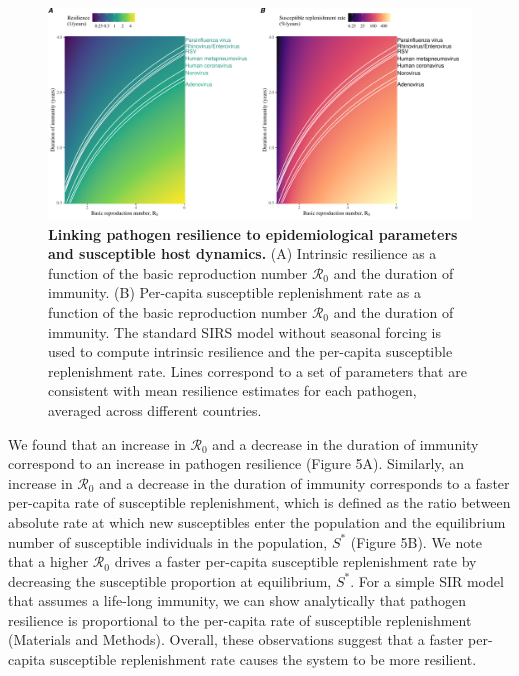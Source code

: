 \documentclass[12pt]{article}
\begin{document}
\begin{figure}[!th]
\begin{center}
\includegraphics[width=\textwidth]{../figure5/figure5.pdf}
\caption{
\textbf{Linking pathogen resilience to epidemiological parameters and susceptible host dynamics.}
(A) Intrinsic resilience as a function of the basic reproduction number $\mathcal R_0$ and the duration of immunity.
(B) Per-capita susceptible replenishment rate as a function of the basic reproduction number $\mathcal R_0$ and the duration of immunity.
The standard SIRS model without seasonal forcing is used to compute intrinsic resilience and the per-capita susceptible replenishment rate.
Lines correspond to a set of parameters that are consistent with mean resilience estimates for each pathogen, averaged across different countries.
}
\end{center}
\end{figure}

We found that an increase in $\mathcal R_0$ and a decrease in the duration of immunity correspond to an increase in pathogen resilience (Figure 5A).
Similarly, an increase in $\mathcal R_0$ and a decrease in the duration of immunity corresponds to a faster per-capita rate of susceptible replenishment, which is defined as the ratio between absolute rate at which new susceptibles enter the population and the equilibrium number of susceptible individuals in the population, $S^\ast$ (Figure 5B).
We note that a higher $\mathcal R_0$ drives a faster per-capita susceptible replenishment rate by decreasing the susceptible proportion at equilibrium, $S^\ast$.
For a simple SIR model that assumes a life-long immunity, we can show analytically that pathogen resilience is proportional to the per-capita rate of susceptible replenishment (Materials and Methods).
Overall, these observations suggest that a faster per-capita susceptible replenishment rate causes the system to be more resilient.
\end{document}
